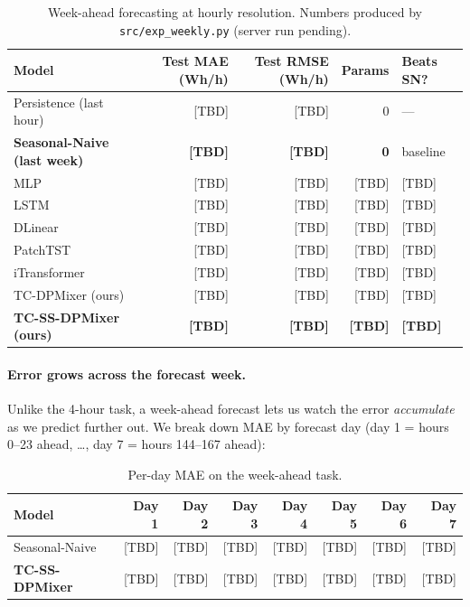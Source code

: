 \documentclass[11pt,letterpaper]{article}
\begin{document}
\begin{table}[H]
\centering
\small
\begin{tabular}{lrrrl}
\toprule
\textbf{Model} & \textbf{Test MAE (Wh/h)} & \textbf{Test RMSE (Wh/h)} & \textbf{Params} & \textbf{Beats SN?} \\
\midrule
Persistence (last hour)                & [TBD] & [TBD] & 0     & --- \\
\textbf{Seasonal-Naive (last week)}    & \textbf{[TBD]} & \textbf{[TBD]} & \textbf{0} & baseline \\
MLP                                    & [TBD] & [TBD] & [TBD] & [TBD] \\
LSTM                                   & [TBD] & [TBD] & [TBD] & [TBD] \\
DLinear                                & [TBD] & [TBD] & [TBD] & [TBD] \\
PatchTST                               & [TBD] & [TBD] & [TBD] & [TBD] \\
iTransformer                           & [TBD] & [TBD] & [TBD] & [TBD] \\
TC-DPMixer (ours)                      & [TBD] & [TBD] & [TBD] & [TBD] \\
\textbf{TC-SS-DPMixer (ours)}          & \textbf{[TBD]} & \textbf{[TBD]} & \textbf{[TBD]} & \textbf{[TBD]} \\
\bottomrule
\end{tabular}
\caption{Week-ahead forecasting at hourly resolution. Numbers produced by
\texttt{src/exp\_weekly.py} (server run pending).}
\end{table}

\paragraph{Error grows across the forecast week.} Unlike the 4-hour task,
a week-ahead forecast lets us watch the error \emph{accumulate} as we
predict further out. We break down MAE by forecast day (day 1 = hours
0--23 ahead, \ldots, day 7 = hours 144--167 ahead):

\begin{table}[H]
\centering
\small
\begin{tabular}{lrrrrrrr}
\toprule
\textbf{Model} & \textbf{Day 1} & \textbf{Day 2} & \textbf{Day 3} & \textbf{Day 4} & \textbf{Day 5} & \textbf{Day 6} & \textbf{Day 7} \\
\midrule
Seasonal-Naive            & [TBD] & [TBD] & [TBD] & [TBD] & [TBD] & [TBD] & [TBD] \\
\textbf{TC-SS-DPMixer}    & [TBD] & [TBD] & [TBD] & [TBD] & [TBD] & [TBD] & [TBD] \\
\bottomrule
\end{tabular}
\caption{Per-day MAE on the week-ahead task.}
\end{table}
\end{document}
